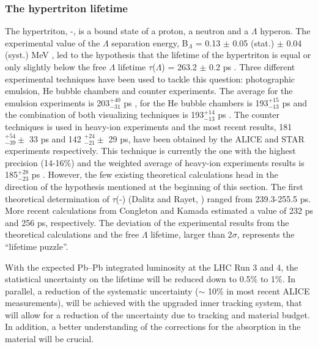 \subsubsection{The hypertriton lifetime}
The hypertriton, \hyp, is a bound state of a proton, a neutron and a $\Lambda$ hyperon.
The experimental value of the $\Lambda$ separation energy, B$_{\Lambda}$ = 0.13 $\pm$ 0.05 (stat.) $\pm$ 0.04 (syst.) MeV \cite{davis20053}, led to the hypothesis that the lifetime of the hypertriton is equal or only slightly below the free $\Lambda$ lifetime $\tau$($\Lambda$) = 263.2 $\pm$ 0.2 ps \cite{pdg:2017}.
Three different experimental techniques have been used to tackle this question: photographic emulsion, He bubble chambers and counter experiments. The average for the emulsion experiments is 203$^{+40}_{-31}$ ps \cite{agnello:2016}, for the He bubble chambers is 193$^{+15}_{-13}$ ps \cite{agnello:2016} and the combination of both visualizing techniques is 193$^{+14}_{-13}$ ps \cite{agnello:2016}. The counter techniques is used in heavy-ion experiments and the most recent results, 181 $^{+54}_{-39} \pm$ 33 ps and 142 $^{+24}_{-21} \pm$ 29 ps, have been obtained by the ALICE \cite{PhysLettB.754.360} and STAR \cite{PhysRevC.97.054909} experiments respectively. This technique is currently the one with the highest precision (14-16$\%$) and the weighted average of heavy-ion experiments results is 185$^{+28}_{-23}$ ps \cite{agnello:2016}.
However, the few existing theoretical calculations head in the direction of the hypothesis mentioned at the beginning of this section. 
The first theoretical determination of $\tau$(\hyp) (Dalitz and Rayet, \cite{NuovCim.A46}) ranged from 239.3-255.5 ps. More recent calculations from Congleton \cite{jphysg.18.339} and Kamada \cite{Phys.Rev.C57} estimated a value of 232 ps and 256 ps, respectively. The deviation of the experimental results from the theoretical calculations and the free $\Lambda$ lifetime, larger than 2$\sigma$, represents the ``lifetime puzzle''.
 
With the expected Pb--Pb integrated luminosity at the LHC Run 3 and 4, the statistical uncertainty on the lifetime will be reduced down to 0.5$\%$ to 1$\%$. 
In parallel, a reduction of the systematic uncertainty ($\sim$ 10$\%$ in most recent ALICE measurements), will be achieved with the upgraded inner tracking system, that will allow for a reduction of the uncertainty due to tracking and material budget. 
In addition, a better understanding of the corrections for the absorption in the material will be crucial. 


